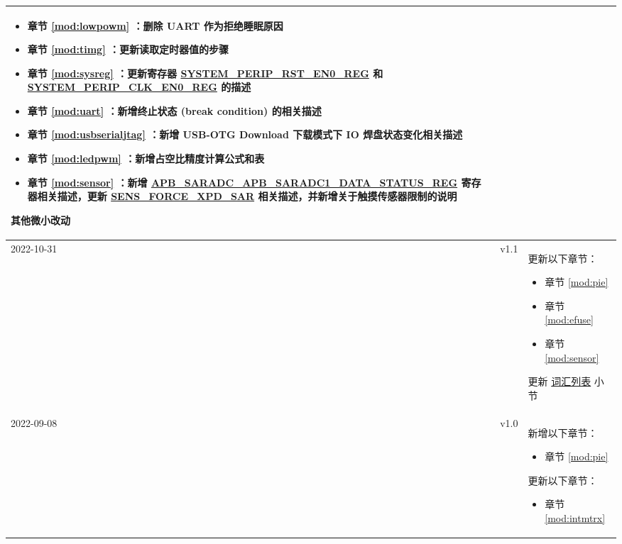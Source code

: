 \begin{longtable}[l]{ | m{2cm} | m{1.5cm} | m{12cm} | }
\begin{itemize}
        \item 章节 \ref{mod:lowpowm} \textit{\nameref{mod:lowpowm}}：删除 UART 作为拒绝睡眠原因 %
        \item 章节 \ref{mod:timg} \textit{\nameref{mod:timg}}：更新读取定时器值的步骤 %
        \item 章节 \ref{mod:sysreg} \textit{\nameref{mod:sysreg}}：更新寄存器 \newline \hyperref[regdesc:SYSTEMPERIPRSTEN0REG]{SYSTEM\_PERIP\_RST\_EN0\_REG} 和 \hyperref[regdesc:SYSTEMPERIPCLKEN0REG]{SYSTEM\_PERIP\_CLK\_EN0\_REG} 的描述 %
        \item 章节 \ref{mod:uart} \textit{\nameref{mod:uart}}：新增终止状态 (break condition) 的相关描述 %
        \item 章节 \ref{mod:usbserialjtag} \textit{\nameref{mod:usbserialjtag}}：新增 USB-OTG Download 下载模式下 IO 焊盘状态变化相关描述 %
        \item 章节 \ref{mod:ledpwm} \textit{\nameref{mod:ledpwm}}：新增占空比精度计算公式和表 \textit{\nameref{tab:ledc-common-freq-res}}
        \item 章节 \ref{mod:sensor} \textit{\nameref{mod:sensor}}：\newline 新增 \hyperref[regdesc:APBSARADCAPBSARADC1DATASTATUSREG]{APB\_SARADC\_APB\_SARADC1\_DATA\_STATUS\_REG} 寄存器相关描述，更新 \hyperref[fielddesc:SENSFORCEXPDSAR]{SENS\_FORCE\_XPD\_SAR} 相关描述，并新增关于触摸传感器限制的说明
    \end{itemize}
    其他微小改动
    \\\hline
    2022-10-31         & v1.1  &
    更新以下章节：
    \begin{itemize}
        \item 章节 \ref{mod:pie} \textit{\nameref{mod:pie}}
        \item 章节 \ref{mod:efuse} \textit{\nameref{mod:efuse}}
        \item 章节 \ref{mod:sensor} \textit{\nameref{mod:sensor}}%
    \end{itemize}
    更新 \hyperref[glossary]{词汇列表} 小节
    \\\hline
    2022-09-08         & v1.0  &
    新增以下章节：
    \begin{itemize}
        \item 章节 \ref{mod:pie} \textit{\nameref{mod:pie}}
    \end{itemize}
    更新以下章节：
    \begin{itemize}
        \item 章节 \ref{mod:intmtrx} \textit{\nameref{mod:intmtrx}}

\end{itemize}
\end{longtable}
